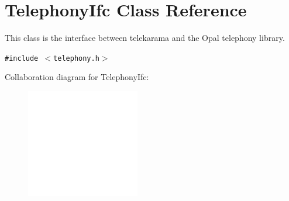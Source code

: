 \hypertarget{classTelephonyIfc}{
\section{TelephonyIfc Class Reference}
\label{classTelephonyIfc}
}
This class is the interface between telekarama and the Opal telephony library.  


{\tt \#include $<$telephony.h$>$}

Collaboration diagram for TelephonyIfc:\nopagebreak
\begin{figure}[H]
\begin{center}
\leavevmode
\includegraphics[width=140pt]{classTelephonyIfc__coll__graph}
\end{center}
\end{figure}
